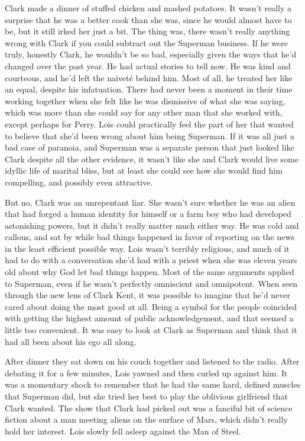 \documentclass[ebook,12pt]{memoir}
\begin{document}
Clark made a dinner of stuffed chicken and mashed potatoes. It wasn't
really a surprise that he was a better cook than she was, since he would
almost have to be, but it still irked her just a bit. The thing was,
there wasn't really anything wrong with Clark if you could subtract out
the Superman business. If he were truly, honestly Clark, he wouldn't be
so bad, especially given the ways that he'd changed over the past year.
He had actual stories to tell now. He was kind and courteous, and he'd
left the naiveté behind him. Most of all, he treated her like an equal,
despite his infatuation. There had never been a moment in their time
working together when she felt like he was dismissive of what she was
saying, which was more than she could say for any other man that she
worked with, except perhaps for Perry. Lois could practically feel the
part of her that wanted to believe that she'd been wrong about him being
Superman. If it was all just a bad case of paranoia, and Superman was a
separate person that just looked like Clark despite all the other
evidence, it wasn't like she and Clark would live some idyllic life of
marital bliss, but at least she could see how she would find him
compelling, and possibly even attractive.

But no, Clark was an unrepentant liar. She wasn't sure whether he was an
alien that had forged a human identity for himself or a farm boy who had
developed astonishing powers, but it didn't really matter much either
way. He was cold and callous, and sat by while bad things happened in
favor of reporting on the news in the least efficient possible way. Lois
wasn't terribly religious, and much of it had to do with a conversation
she'd had with a priest when she was eleven years old about why God let
bad things happen. Most of the same arguments applied to Superman, even
if he wasn't perfectly omniscient and omnipotent. When seen through the
new lens of Clark Kent, it was possible to imagine that he'd never cared
about doing the most good at all. Being a symbol for the people
coincided with getting the highest amount of public acknowledgement, and
that seemed a little too convenient. It was easy to look at Clark as
Superman and think that it had all been about his ego all along.

After dinner they sat down on his couch together and listened to the
radio. After debating it for a few minutes, Lois yawned and then curled
up against him. It was a momentary shock to remember that he had the
same hard, defined muscles that Superman did, but she tried her best to
play the oblivious girlfriend that Clark wanted. The show that Clark had
picked out was a fanciful bit of science fiction about a man meeting
aliens on the surface of Mars, which didn't really hold her interest.
Lois slowly fell asleep against the Man of Steel.
\end{document}
